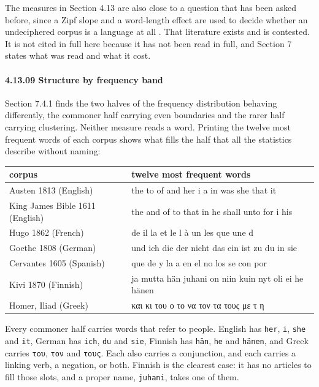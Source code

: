 The measures in Section 4.13 are also close to a question that has been asked before, since a Zipf slope and a word-length effect are used to decide whether an undeciphered corpus is a language at all \cite{src:Sproat}. That literature exists and is contested. It is not cited in full here because it has not been read in full, and Section 7 states what was read and what it cost.

\paragraph{4.13.09 Structure by frequency band}

Section 7.4.1 finds the two halves of the frequency distribution behaving differently, the commoner half carrying even boundaries and the rarer half carrying clustering. Neither measure reads a word. Printing the twelve most frequent words of each corpus shows what fills the half that all the statistics describe without naming:


\tiny
\setlength{\tabcolsep}{2pt}
\begin{longtable}{@{}>{\raggedright\arraybackslash}p{}>{\raggedright\arraybackslash}p{}@{}}
\toprule
corpus & twelve most frequent words \\
\midrule
Austen 1813 (English) & the to of and her i a in was she that it \\
King James Bible 1611 (English) & the and of to that in he shall unto for i his \\
Hugo 1862 (French) & de il la et le l à un les que une d \\
Goethe 1808 (German) & und ich die der nicht das ein ist zu du in sie \\
Cervantes 1605 (Spanish) & que de y la a en el no los se con por \\
Kivi 1870 (Finnish) & ja mutta hän juhani on niin kuin nyt oli ei he hänen \\
Homer, Iliad (Greek) & και κι του ο το να τον τα τους με τ η \\
\bottomrule
\end{longtable}
\normalsize

Every commoner half carries words that refer to people. English has \texttt{her}, \texttt{i}, \texttt{she} and \texttt{it}, German has \texttt{ich}, \texttt{du} and \texttt{sie}, Finnish has \texttt{hän}, \texttt{he} and \texttt{hänen}, and Greek carries \texttt{του}, \texttt{τον} and \texttt{τους}. Each also carries a conjunction, and each carries a linking verb, a negation, or both. Finnish is the clearest case: it has no articles to fill those slots, and a proper name, \texttt{juhani}, takes one of them.

